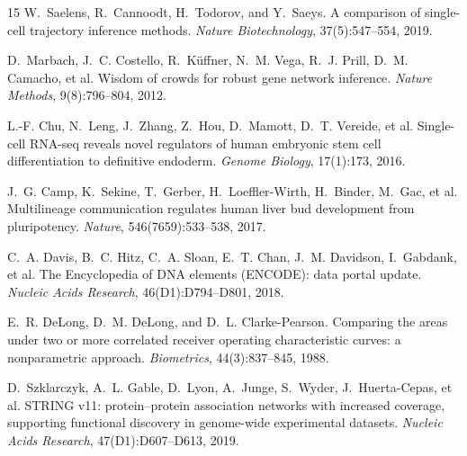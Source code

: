 \documentclass[sigconf]{acmart}
\begin{document}
\begin{thebibliography}{15}
W.~Saelens, R.~Cannoodt, H.~Todorov, and Y.~Saeys.
A comparison of single-cell trajectory inference methods.
\emph{Nature Biotechnology}, 37(5):547--554, 2019.

D.~Marbach, J.~C. Costello, R.~K\"uffner, N.~M. Vega, R.~J. Prill, D.~M. Camacho, et al.
Wisdom of crowds for robust gene network inference.
\emph{Nature Methods}, 9(8):796--804, 2012.

L.-F. Chu, N.~Leng, J.~Zhang, Z.~Hou, D.~Mamott, D.~T. Vereide, et al.
Single-cell RNA-seq reveals novel regulators of human embryonic stem
cell differentiation to definitive endoderm.
\emph{Genome Biology}, 17(1):173, 2016.

J.~G. Camp, K.~Sekine, T.~Gerber, H.~Loeffler-Wirth, H.~Binder, M.~Gac, et al.
Multilineage communication regulates human liver bud development from
pluripotency. \emph{Nature}, 546(7659):533--538, 2017.

C.~A. Davis, B.~C. Hitz, C.~A. Sloan, E.~T. Chan, J.~M. Davidson, I.~Gabdank, et al.
The Encyclopedia of DNA elements (ENCODE): data portal update.
\emph{Nucleic Acids Research}, 46(D1):D794--D801, 2018.

E.~R. DeLong, D.~M. DeLong, and D.~L. Clarke-Pearson.
Comparing the areas under two or more correlated receiver operating
characteristic curves: a nonparametric approach.
\emph{Biometrics}, 44(3):837--845, 1988.

D.~Szklarczyk, A.~L. Gable, D.~Lyon, A.~Junge, S.~Wyder, J.~Huerta-Cepas, et al.
STRING v11: protein--protein association networks with increased
coverage, supporting functional discovery in genome-wide experimental
datasets. \emph{Nucleic Acids Research}, 47(D1):D607--D613, 2019.

\end{thebibliography}
\end{document}

